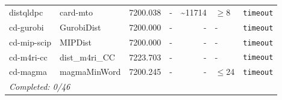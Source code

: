 \begin{longtable}{llrrrl p{}}
distqldpc & card-mto & 7200.038 & - & \textasciitilde{}11714 & $\geq$8 & \texttt{timeout} \\
cd-gurobi & GurobiDist & 7200.000 & - & - & - & \texttt{timeout} \\
cd-mip-scip & MIPDist & 7200.000 & - & - & - & \texttt{timeout} \\
cd-m4ri-cc & dist\_m4ri\_CC & 7223.703 & - & - & - & \texttt{timeout} \\
cd-magma & magmaMinWord & 7200.245 & - & - & $\leq$24 & \texttt{timeout} \\
\midrule
\multicolumn{7}{l}{\textit{Completed: 0/46}} \\
\end{longtable}
